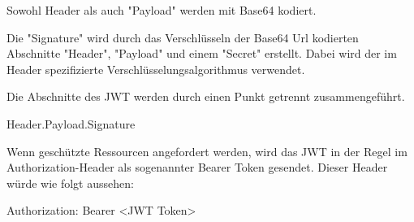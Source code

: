 Sowohl Header als auch "Payload" werden mit Base64 kodiert.

Die "Signature" wird durch das Verschlüsseln der Base64 Url kodierten Abschnitte "Header", "Payload" und einem "Secret" erstellt. 
Dabei wird der im Header spezifizierte Verschlüsselungsalgorithmus verwendet. \cite{RFC7519} \cite{WdsJWT}

Die Abschnitte des JWT werden durch einen Punkt getrennt zusammengeführt. 

{\ttfamily Header.Payload.Signature}

Wenn geschützte Ressourcen angefordert werden, wird das JWT in der Regel im Authorization-Header als sogenannter Bearer Token gesendet. Dieser Header würde wie folgt aussehen\cite{Auth0JWT}:

{\ttfamily Authorization: Bearer \textless JWT Token\textgreater}


